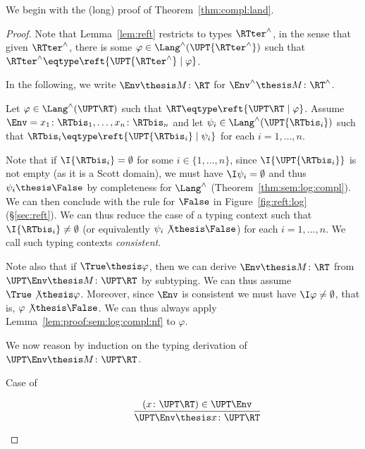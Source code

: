 We begin with the (long) proof of Theorem~\ref{thm:compl:land}.


\ThmComplLand*


\begin{proof}
Note that Lemma~\ref{lem:reft} 
restricts to types $\RTter^\land$, in the sense that given $\RTter^\land$,
there is some $\varphi \in \Lang^\land(\UPT{\RTter^\land})$
such that $\RTter^\land \eqtype \reft{\UPT{\RTter^\land} \mid \varphi}$.

In the following, we write $\Env \thesis M \colon \RT$
for $\Env^\land \thesis M \colon \RT^\land$.

Let $\varphi \in \Lang^\land(\UPT\RT)$ such that
$\RT \eqtype \reft{\UPT\RT \mid \varphi}$.
Assume
$\Env = x_1\colon \RTbis_1,\dots,x_n \colon \RTbis_n$
and
let $\psi_i \in \Lang^\land(\UPT{\RTbis_i})$
such that
$\RTbis_i \eqtype \reft{\UPT{\RTbis_i} \mid \psi_i}$
for each $i = 1,\dots,n$.

Note that if
$\I{\RTbis_i} = \emptyset$ for some $i \in \{1,\dots,n\}$,
since $\I{\UPT{\RTbis_i}}$ is not empty (as it is a Scott domain),
we must have $\I\psi_i = \emptyset$
and thus $\psi_i \thesis \False$ by
completeness for $\Lang^\land$
(Theorem~\ref{thm:sem:log:compl}).
We can then conclude with the rule for $\False$ in Figure~\ref{fig:reft:log}
(\S\ref{sec:reft}).
%
We can thus reduce the case of a typing context
such that 
$\I{\RTbis_i} \neq \emptyset$
(or equivalently $\psi_i \not\thesis \False$)
for each $i = 1,\dots,n$.
We call such typing contexts \emph{consistent}.

Note also that if $\True \thesis \varphi$,
then we can derive $\Env \thesis M \colon \RT$
from $\UPT\Env \thesis M \colon \UPT\RT$ by subtyping.
We can thus assume $\True \not\thesis \varphi$.
%
Moreover, since $\Env$ is consistent we must have $\I\varphi \neq \emptyset$,
that is, $\varphi \not\thesis \False$.
We can thus always apply Lemma~\ref{lem:proof:sem:log:compl:nf} to $\varphi$.

We now reason by induction on the typing derivation of
$\UPT\Env \thesis M \colon \UPT\RT$.
\begin{description}
\item[Case of]
\[
\dfrac{(x\colon\UPT\RT) \in \UPT\Env}
  {\UPT\Env \thesis x\colon\UPT\RT}
\]


\end{description}
\end{proof}
